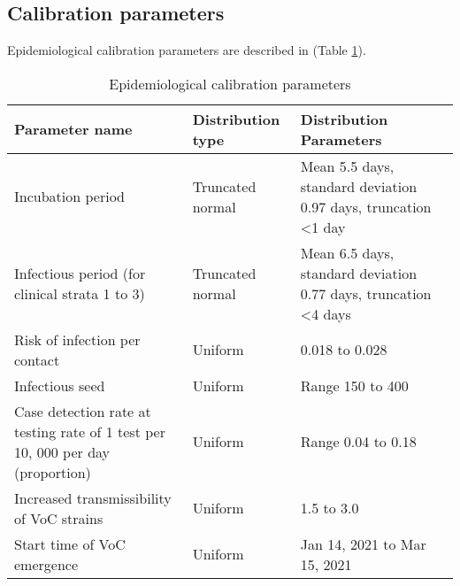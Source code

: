 \subsection{Calibration parameters}
Epidemiological calibration parameters are described in (Table \ref{tab:calibration_params}). 
\vspace{-24mm}
\begin{table}[t]

    \begin{tabular}{| p{4.4cm} | p{4.4cm} | p{5cm} |}
        \hline
        \textbf{Parameter name} & \textbf{Distribution type} & \textbf{Distribution Parameters} \\
        \hline
        Incubation period & Truncated normal & Mean 5.5 days, standard 			        deviation 0.97 days, truncation \textless 1 day \\
      \hline
      Infectious period (for clinical strata 1 to 3) & Truncated normal &         	  Mean 6.5 days, standard deviation 0.77 days, truncation \textless 4 		      days \\
      \hline
      Risk of infection per contact & Uniform & 0.018 to 0.028\\
      \hline
      Infectious seed & Uniform & Range 150 to 400 \\
      \hline
   	  Case detection rate at testing rate of 1 test per 10, 000 per day 		      (proportion) & Uniform 	      & Range 0.04 to 0.18 \\
   	  \hline
   	  Increased transmissibility of VoC strains  & Uniform & 1.5 to 3.0\\
      \hline
      Start time of VoC emergence  & Uniform & Jan 14, 2021 to Mar 15, 2021 \\
      \hline
    \end{tabular}
    \caption{Epidemiological calibration parameters}
    \label{tab:calibration_params}
\end{table}
\clearpage
